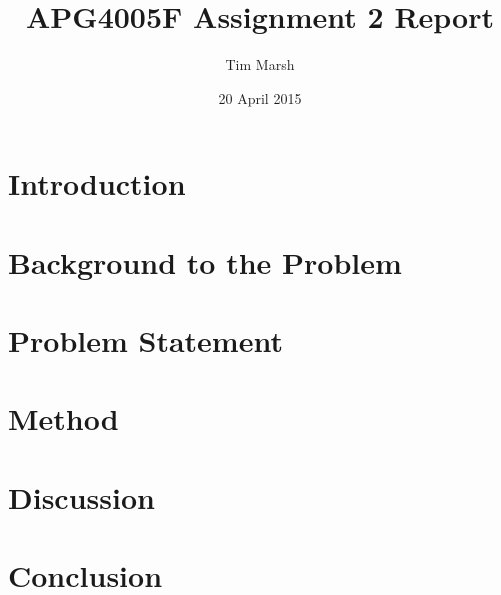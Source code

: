 \documentclass[11pt,a4paper]{article}
\title{APG4005F Assignment 2 Report}
\date{20 April 2015}
\author{Tim Marsh}
\begin{document}
	
	\maketitle
	\newpage
	\tableofcontents
	\listoffigures
	\newpage
	
	
	\section{Introduction}
	


	\section{Background to the Problem}
	
	
	\section{Problem Statement}

	
	\section{Method}
	
	
	
	\section{Discussion}
	
	
	
	\section{Conclusion}
	

	
\end{document}
